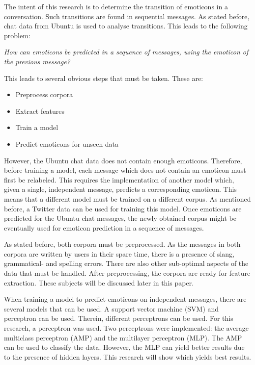 
\begin{comment}
Problem: (roughly 1-2 pages)
• Explain the problem; what kind of assumptions / observations you have about the problem

\red{Find out what should be actually in this section} \\
\end{comment}

The intent of this research is to determine the transition of emoticons in a conversation. Such transitions are found in sequential messages. As stated before, chat data from Ubuntu is used to analyse transitions. This leads to the following problem: 
\begin{center}
\textit{How can emoticons be predicted in a sequence of messages, using the emoticon of the previous message?}
\end{center}

This leads to several obvious steps that must be taken. These are:
\begin{itemize}
\item Preprocess corpora
\item Extract features
\item Train a model
\item Predict emoticons for unseen data
\end{itemize}

However, the Ubuntu chat data does not contain enough emoticons. Therefore, before training a model, each message which does not contain an emoticon must first be relabeled. This requires the implementation of another model which, given a single, independent message, predicts a corresponding emoticon. This means that a different model must be trained on a different corpus. As mentioned before, a Twitter data can be used for training this model. Once emoticons are predicted for the Ubuntu chat messages, the newly obtained corpus might be eventually used for emoticon prediction in a sequence of messages.


As stated before, both corpora must be preprocessed. As the messages in both corpora are written by users in their spare time, there is a presence of slang, grammatical- and spelling errors. There are also other sub-optimal aspects of the data that must be handled. After preprocessing, the corpora are ready for feature extraction. These subjects will be discussed later in this paper.


When training a model to predict emoticons on independent messages, there are several models that can be used. A support vector machine (SVM) and perceptron can be used. Therein, different perceptrons can be used. For this research, a perceptron was used. Two perceptrons were implemented: the average multiclass perceptron (AMP) and the multilayer perceptron (MLP). The AMP can be used to classify the data. However, the MLP can yield better results due to the presence of hidden layers. This research will show which yields best results.

